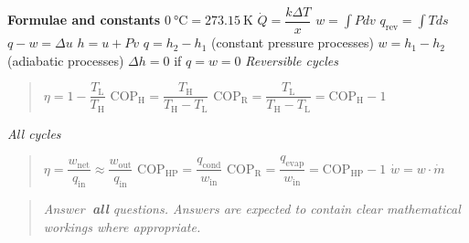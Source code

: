 \documentclass[a4paper,12pt,fleqn]{article}
\begin{document}
\newpage
\textbf{Formulae and constants}
\newline\newline
$\SI{0}{\celsius}=\SI{273.15}{\kelvin}$
\newline\newline
$\dot Q =\dfrac{k\Delta T}{x}$
\newline\newline
$w=\int{Pdv}$
\newline\newline
$q_\mathrm{rev}=\int{Tds}$
\newline\newline
$q-w=\Delta u$
\newline\newline
$h=u+Pv$
\newline\newline
$q=h_2-h_1$ (constant pressure processes)
\newline\newline
$w=h_1-h_2$ (adiabatic processes)
\newline\newline
$\Delta h = 0$ if $q=w=0$
\newline\newline
\textit{Reversible cycles}\
\begin{quote}
\indent $\eta = 1 - \dfrac{T_\mathrm{L}}{T_\mathrm{H}}$ 
\newline\newline
\indent $\mathrm{COP_H}=\dfrac{T_\mathrm{H}}{T_\mathrm{H}-T_\mathrm{L}}$
\newline\newline
\indent $\mathrm{COP_R}=\dfrac{T_\mathrm{L}}{T_\mathrm{H}-T_\mathrm{L}}=\mathrm{COP_H}-1$
\newline
\end{quote}
\textit{All cycles}\
\begin{quote}
$\eta=\dfrac{w_\mathrm{net}}{q_\mathrm{in}}\approx\dfrac{w_\mathrm{out}}{q_\mathrm{in}}$
\newline\newline
$\mathrm{COP_{HP}}=\dfrac{q_\mathrm{cond}}{w_\mathrm{in}}$
\newline\newline
$\mathrm{COP_{R}}=\dfrac{q_\mathrm{evap}}{w_\mathrm{in}}=\mathrm{COP_{HP}}-1$
\newline\newline
$\dot w =w\cdot \dot m$
\end{quote}

\newpage
\begin{quote}
\textit{Answer\textbf{\ all} questions.  Answers are expected to contain clear mathematical workings where appropriate.}
\end{quote}
\end{document}
